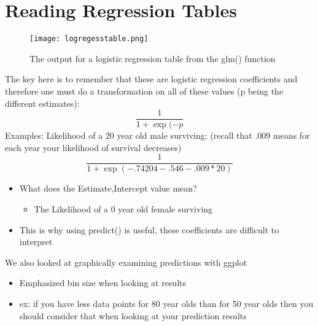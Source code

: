 \section{Reading Regression Tables}
\begin{figure}[ht]
  \begin{center}
    \texttt{[image: logregesstable.png]}
    \caption{ The output for a logistic regression table from the glm() function 
     }
    \label{fig:example_figure}
  \end{center}
\end{figure}
The key here is to remember that these are logistic regression coefficients and therefore one must do a transformation on all of these values (p being the different estimates):
\begin{equation}
    \frac{1}{1+\exp(-p}
\end{equation}
Examples: 
Likelihood of a 20 year old male surviving: (recall that .009 means for each year your likelihood of survival decreases) 
\begin{equation}
    \frac{1}{1+\exp(-.74204-.546-.009*20)}
\end{equation}
\begin{itemize}
    \item What does the Estimate,Intercept value mean? 
    \begin{itemize}
        \item The Likelihood of a 0 year old female surviving
    \end{itemize}
    \item This is why using predict() is useful, these coefficients are difficult to interpret 
\end{itemize}
We also looked at graphically examining predictions with ggplot
\begin{itemize}
    \item Emphasized bin size when looking at results
    \item ex: if you have less data points for 80 year olds than for 50 year olds then you should consider that when looking at your prediction results
\end{itemize}

